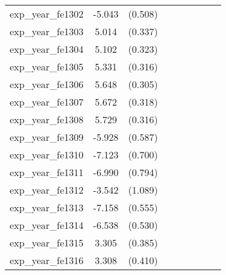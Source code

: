 {\begin{tabular}{l*{4}{cc}}
exp\_year\_fe1302&   -5.043\sym{***}&  (0.508)&                  &         &                  &         &                  &         \\
exp\_year\_fe1303&    5.014\sym{***}&  (0.337)&                  &         &                  &         &                  &         \\
exp\_year\_fe1304&    5.102\sym{***}&  (0.323)&                  &         &                  &         &                  &         \\
exp\_year\_fe1305&    5.331\sym{***}&  (0.316)&                  &         &                  &         &                  &         \\
exp\_year\_fe1306&    5.648\sym{***}&  (0.305)&                  &         &                  &         &                  &         \\
exp\_year\_fe1307&    5.672\sym{***}&  (0.318)&                  &         &                  &         &                  &         \\
exp\_year\_fe1308&    5.729\sym{***}&  (0.316)&                  &         &                  &         &                  &         \\
exp\_year\_fe1309&   -5.928\sym{***}&  (0.587)&                  &         &                  &         &                  &         \\
exp\_year\_fe1310&   -7.123\sym{***}&  (0.700)&                  &         &                  &         &                  &         \\
exp\_year\_fe1311&   -6.990\sym{***}&  (0.794)&                  &         &                  &         &                  &         \\
exp\_year\_fe1312&   -3.542\sym{**} &  (1.089)&                  &         &                  &         &                  &         \\
exp\_year\_fe1313&   -7.158\sym{***}&  (0.555)&                  &         &                  &         &                  &         \\
exp\_year\_fe1314&   -6.538\sym{***}&  (0.530)&                  &         &                  &         &                  &         \\
exp\_year\_fe1315&    3.305\sym{***}&  (0.385)&                  &         &                  &         &                  &         \\
exp\_year\_fe1316&    3.308\sym{***}&  (0.410)&                  &         &                  &         &                  &         \\

\end{tabular}}
